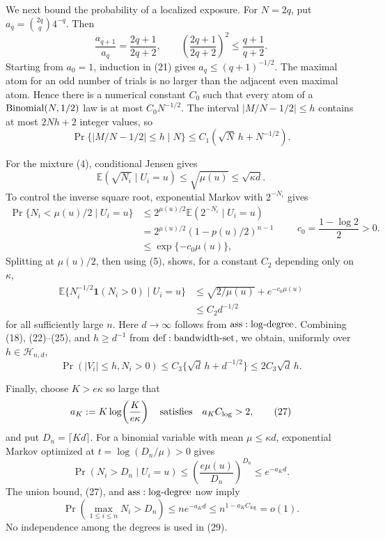 We next bound the probability of a localized exposure.  For \(N=2q\), put \(a_q={2q\choose q}4^{-q}\).  Then
\[
 \frac{a_{q+1}}{a_q}=\frac{2q+1}{2q+2},
 \qquad
 \left(\frac{2q+1}{2q+2}\right)^2\leq\frac{q+1}{q+2}.
\tag{21}
\]
Starting from \(a_0=1\), induction in (21) gives \(a_q\leq(q+1)^{-1/2}\).  The maximal atom for an odd number of trials is no larger than the adjacent even maximal atom.  Hence there is a numerical constant \(C_0\) such that every atom of a \({\rm Binomial}(N,1/2)\) law is at most \(C_0N^{-1/2}\).  The interval \(|M/N-1/2|\leq h\) contains at most \(2Nh+2\) integer values, so
\[
 \Pr\{|M/N-1/2|\leq h\mid N\}
 \leq C_1(\sqrt N\,h+N^{-1/2}).
\tag{22}
\]

For the mixture (4), conditional Jensen gives
\[
 \mathbb E(\sqrt{N_i}\mid U_i=u)\leq\sqrt{\mu(u)}\leq\sqrt{\kappa d}.
\tag{23}
\]
To control the inverse square root, exponential Markov with \(2^{-N_i}\) gives
\[
 \begin{aligned}
 \Pr\{N_i<\mu(u)/2\mid U_i=u\}
 &\leq 2^{\mu(u)/2}\mathbb E(2^{-N_i}\mid U_i=u)\\
 &=2^{\mu(u)/2}(1-p(u)/2)^{n-1}\\
 &\leq\exp\{-c_0\mu(u)\},
 \end{aligned}
 \qquad c_0=\frac{1-\log2}{2}>0.
\tag{24}
\]
Splitting at \(\mu(u)/2\), then using (5), shows, for a constant \(C_2\) depending only on \(\kappa\),
\[
 \begin{aligned}
 \mathbb E\{N_i^{-1/2}\mathbf1(N_i>0)\mid U_i=u\}
 &\leq\sqrt{2/\mu(u)}+e^{-c_0\mu(u)}\\
 &\leq C_2d^{-1/2}
 \end{aligned}
\tag{25}
\]
for all sufficiently large \(n\).  Here \(d\to\infty\) follows from \({\rm ass:log\text{-}degree}\).  Combining (18), (22)--(25), and \(h\geq d^{-1}\) from \({\rm def:bandwidth\text{-}set}\), we obtain, uniformly over \(h\in\mathcal H_{n,d}\),
\[
 \Pr(|V_i|\leq h,N_i>0)
 \leq C_3\{\sqrt d\,h+d^{-1/2}\}
 \leq2C_3\sqrt d\,h.
\tag{26}
\]

Finally, choose \(K>e\kappa\) so large that
\[
 a_K:=K\log\!\left(\frac{K}{e\kappa}\right)
 \quad\hbox{satisfies}\quad a_KC_{\log}>2,
\tag{27}
\]
and put \(D_n=\lceil Kd\rceil\).  For a binomial variable with mean \(\mu\leq\kappa d\), exponential Markov optimized at \(t=\log(D_n/\mu)>0\) gives
\[
 \Pr(N_i>D_n\mid U_i=u)
 \leq\left(\frac{e\mu(u)}{D_n}\right)^{D_n}
 \leq e^{-a_Kd}.
\tag{28}
\]
The union bound, (27), and \({\rm ass:log\text{-}degree}\) now imply
\[
 \Pr\left(\max_{1\leq i\leq n}N_i>D_n\right)
 \leq ne^{-a_Kd}
 \leq n^{1-a_KC_{\log}}=o(1).
\tag{29}
\]
No independence among the degrees is used in (29).

